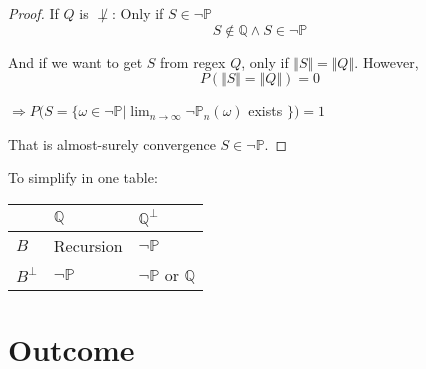 \documentclass[12pt,a4paper]{article}
\begin{document}
\begin{CJK}{UTF8}{bsmi}
\begin{enumerate}
\begin{proof}
                  If $Q$ is $\not\perp$: Only if $S \in \neg\mathbb{P}$
                  \begin{equation}
                      S \not\in \mathbb{Q} \land S \in \neg\mathbb{P}
                  \end{equation}

                  And if we want to get $S$ from regex $Q$, only if
                  $\mathbin\Vert S \mathbin\Vert = \mathbin\Vert Q \mathbin\Vert$.
                  However,
                  $$P(\mathbin\Vert S \mathbin\Vert = \mathbin\Vert Q \mathbin\Vert)=0$$
                  \begin{center}
                      $\Rightarrow P(S = \{\omega \in \neg \mathbb{P} | \lim_{n \to \infty} \neg \mathbb{P}_{n}(\omega)$ exists $\}) = 1$
                  \end{center}

                  That is almost-surely convergence $S \in \neg\mathbb{P}$.
              \end{proof}

              To simplify in one table:\\
              \begin{center}
                  \begin{tabularx}{6cm} {
                          | >{\raggedright\arraybackslash}X
                          | >{\centering\arraybackslash}X
                          | >{\raggedleft\arraybackslash}X |}
                      \hline
                      \mbox{}     & $\mathbb{Q}$     & $\mathbb{Q}^{\perp}$                \\
                      \hline
                      $B$         & Recursion        & $\neg\mathbb{P}$                    \\
                      \hline
                      $B^{\perp}$ & $\neg\mathbb{P}$ & $\neg\mathbb{P}$ or    $\mathbb{Q}$ \\
                      \hline
                  \end{tabularx}
              \end{center}
    \end{enumerate}

    \section{Outcome}
    

\end{CJK}
\end{document}
